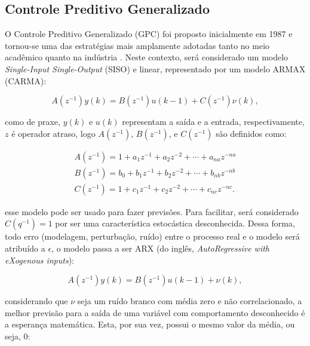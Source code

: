 \documentclass[12pt,           %
a4paper,                       %
openany,                       %
oneside,                       %
chapter=TITLE,                 %
english,                       %
spanish,                       %
brazil,                        %
sumario=tradicional]{abntex2}  %
\begin{document}
\begin{OnehalfSpace}
\subsection{Controle Preditivo Generalizado}
\label{sec:CPG}

O Controle Preditivo Generalizado (GPC) foi proposto inicialmente em 1987 \cite{GPC1, GPC2} e tornou-se uma das estratégias mais amplamente adotadas tanto no meio acadêmico quanto na indústria \cite{camacho2004}. Neste contexto, será considerado um modelo \textit{Single-Input Single-Output} (SISO) e linear, representado por um modelo ARMAX (CARMA):

\begin{equation}%
     \label{eq:carma}
        A(z^{-1})y(k) = B(z^{-1})u(k-1) + C(z^{-1})\nu (k),
\end{equation}

\noindent como de praxe, $y(k)$ e $u(k)$ representam a saída e a entrada, respectivamente, $z$ é operador atraso, logo $A(z^{-1})$, $B(z^{-1})$, e $C(z^{-1})$ são definidos como:

\begin{equation}
\label{eq:poli}
\begin{split}
    A(z^{-1}) = 1 + a_1 z^{-1} + a_2 z^{-2} + \cdots + a_{na} z^{-na}\\
    B(z^{-1}) = b_0 + b_1 z^{-1} + b_2 z^{-2} + \cdots + b_{nb} z^{-nb}\\
    C(z^{-1}) = 1 + c_1 z^{-1} + c_2 z^{-2} + \cdots + c_{nc} z^{-nc}.
\end{split}
\end{equation} 

\noindent esse modelo pode ser usado para fazer previsões. Para facilitar, será considerado $C(q^{-1}) = 1$ por ser uma característica estocástica desconhecida. Dessa forma, todo erro (modelagem, perturbação, ruído) entre o processo real e o modelo será atribuído a $\epsilon$, o modelo passa a ser ARX (do inglês, \textit{AutoRegressive with eXogenous inputs}):

\begin{equation} 
     \label{eq:arx}
        A(z^{-1}) y(k) = B(z^{-1}) u(k-1) + \nu (k),
\end{equation}


\noindent considerando que $\nu$ seja um ruído branco com média zero e não correlacionado, a melhor previsão para a saída de uma variável com comportamento desconhecido é a esperança matemática. Esta, por sua vez, possui o mesmo valor da média, ou seja, 0:


\end{OnehalfSpace}
\end{document}
